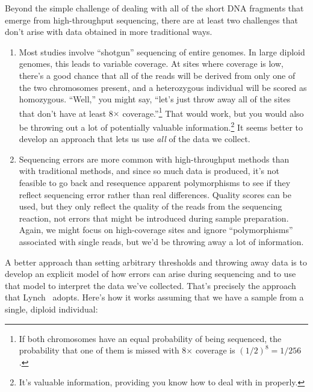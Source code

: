 Beyond the simple challenge of dealing with all of the short DNA
fragments that emerge from high-throughput sequencing, there are at
least two challenges that don't arise with data obtained in more
traditional ways.

\begin{enumerate}

\item Most studies involve ``shotgun'' sequencing of entire
  genomes. In large diploid genomes, this leads to variable
  coverage. At sites where coverage is low, there's a good chance that
  all of the reads will be derived from only one of the two
  chromosomes present, and a heterozygous individual will be scored as
  homozygous. ``Well,'' you might say, ``let's just throw away all of
  the sites that don't have at least 8$\times$ coverage.''\footnote{If
    both chromosomes have an equal probability of being sequenced, the
    probability that one of them is missed with 8$\times$ coverage is
    $(1/2)^8 = 1/256$.} That would work, but you would also be
  throwing out a lot of potentially valuable information.\footnote{It's
    valuable information, providing you know how to deal with in
    properly.} It seems better to develop an approach that lets us use
  {\it all\/} of the data we collect.

\item Sequencing errors are more common with high-throughput methods
  than with traditional methods, and since so much data is produced,
  it's not feasible to go back and resequence apparent polymorphisms
  to see if they reflect sequencing error rather than real
  differences. Quality scores can be used, but they only reflect the
  quality of the reads from the sequencing reaction, not errors that
  might be introduced during sample preparation. Again, we might focus
  on high-coverage sites and ignore ``polymorphisms'' associated with
  single reads, but we'd be throwing away a lot of information. 

\end{enumerate}
A better approach than setting arbitrary thresholds and throwing away
data is to develop an explicit model of how errors can arise during
sequencing and to use that model to interpret the data we've
collected. That's precisely the approach that Lynch~\cite{Lynch-2008}
adopts. Here's how it works assuming that we have a sample from a
single, diploid individual:

